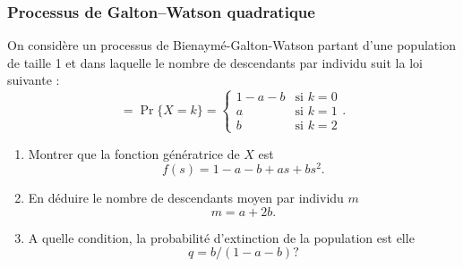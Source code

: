 \subsubsection{Processus de Galton–Watson quadratique \todo{}} 
  On considère un processus de Bienaymé-Galton-Watson partant d'une population de taille 1 et dans laquelle le nombre de descendants par individu suit la loi suivante :
  $$=
  \Pr\{X = k\} = \left\{
    \begin{array}{ll}
      1 - a - b & \text{si $k = 0$} \\
      a & \text{si $k = 1$} \\
      b & \text{si $k = 2$}
    \end{array}\right..
  $$
  \begin{enumerate}
    \item Montrer que la fonction génératrice de $X$ est
    $$
    f(s) = 1 - a - b + as + bs^2.
    $$
    \solution{\todo{}}
    \item En déduire le nombre de descendants moyen par individu $m$
    $$
    m = a + 2b.
    $$
    \item A quelle condition, la probabilité d'extinction de la population est elle
    $$
    q = b/(1 - a - b) ?
    $$
  \end{enumerate}
